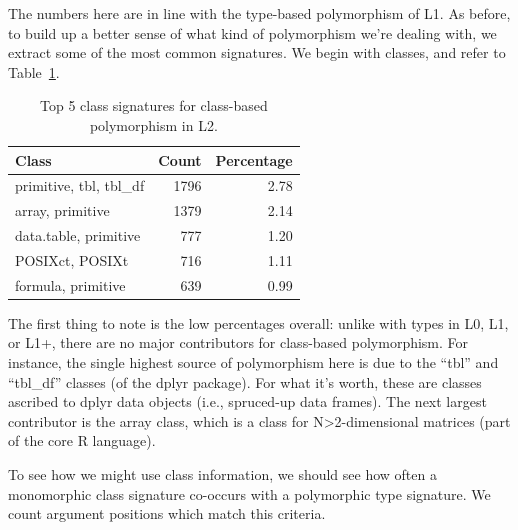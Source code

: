 \documentclass[acmsmall,10pt,review,anonymous]{acmart}\settopmatter{printfolios=true,printccs=false,printacmref=false}
\begin{document}
The numbers here are in line with the type-based polymorphism of L1.
As before, to build up a better sense of what kind of polymorphism we're dealing with, we extract some of the most common signatures.
We begin with classes, and refer to Table~\ref{tab:classpolyL2}.

\begin{table}[ht]
\label{tab:classpolyL2}
\centering
\begin{tabular}{lrr}
  \hline
Class & Count & Percentage \\ 
  \hline
  primitive, tbl, tbl\_df & 1796 & 2.78 \\ 
  array, primitive & 1379 & 2.14 \\ 
  data.table, primitive & 777 & 1.20 \\ 
  POSIXct, POSIXt & 716 & 1.11 \\ 
  formula, primitive & 639 & 0.99 \\ 
   \hline
\end{tabular}
\caption{Top 5 class signatures for class-based polymorphism in L2.}
\end{table}

The first thing to note is the low percentages overall: unlike with types in L0, L1, or L1+, there are no major contributors for class-based polymorphism.
For instance, the single highest source of polymorphism here is due to the ``tbl'' and ``tbl\_df'' classes (of the dplyr package).
For what it's worth, these are classes ascribed to dplyr data objects (i.e., spruced-up data frames).
The next largest contributor is the array class, which is a class for N>2-dimensional matrices (part of the core R language).

To see how we might use class information, we should see how often a monomorphic class signature co-occurs with a polymorphic type signature.
We count \NUMPOLYTYPEMONOCLASS argument positions which match this criteria.
\end{document}
